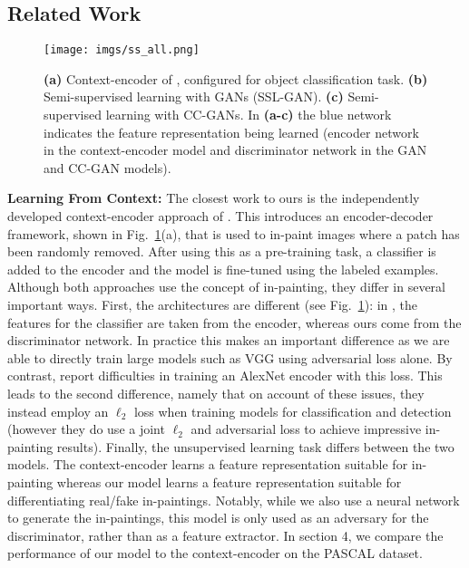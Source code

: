 \documentclass{article} \usepackage{iclr2017_conference,times}
\newcommand{\fig}[1]{Fig.~\ref{fig:#1}}
\begin{document}
\subsection{Related Work}

\begin{figure}[t]
\centering
   \texttt{[image: imgs/ss\_all.png]} 
 \caption{ {\bf(a)} Context-encoder of \cite{pathak2016}, configured for object classification task. 
   {\bf(b)} Semi-supervised learning with GANs (SSL-GAN). 
   {\bf(c)} Semi-supervised learning with CC-GANs. In {\bf (a-c)} the blue network indicates the feature representation being learned (encoder network in the context-encoder model and discriminator network in the GAN and CC-GAN models).
}
 \label{fig:semisup}
\end{figure}




\textbf{Learning From Context:} 
The closest work to ours is the independently
developed context-encoder approach of 
\cite{pathak2016}.
This introduces an encoder-decoder framework, shown in
\fig{semisup}(a), that is used to in-paint images where a patch has
been randomly removed. After using this as a pre-training task, a
classifier is added to the encoder and the model is fine-tuned using
the labeled examples. Although both approaches use the concept of
in-painting, they differ in several important ways. First, the
architectures are different (see \fig{semisup}): in \cite{pathak2016},
the features for the classifier are taken from the encoder, whereas
ours come from the discriminator network. In practice this makes an
important difference as we are able to directly train large models
such as VGG \citep{vgg} using adversarial loss alone. By contrast,
\cite{pathak2016} report difficulties in training an
AlexNet encoder with this loss. This leads to the second difference,
namely that on account of these issues, they instead employ an
$\ell_2$ loss when training models for classification and detection
(however they do use a joint $\ell_2$ and adversarial loss to achieve
impressive in-painting results).  Finally, the unsupervised learning
task differs between the two models.  The context-encoder learns a
feature representation suitable for in-painting whereas our model
learns a feature representation suitable for differentiating real/fake
in-paintings.  Notably, while we also use a neural network to generate
the in-paintings, this model is only used as an adversary for the
discriminator, rather than as a feature extractor.  In section 4, we
compare the performance of our model to the context-encoder on the
PASCAL dataset.
\end{document}

